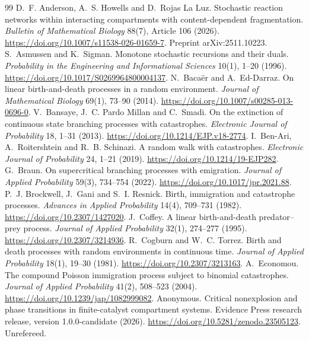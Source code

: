 \documentclass[11pt,a4paper]{article}
\numberwithin{equation}{section}
\theoremstyle{definition}\newtheorem{definition}[theorem]{Definition}
\theoremstyle{remark}\newtheorem{remark}[theorem]{Remark}\newtheorem{example}[theorem]{Example}
\begin{document}
\begin{thebibliography}{99}\small
{} D.~F. Anderson, A.~S. Howells and D.~Rojas La Luz. Stochastic reaction networks within interacting compartments with content-dependent fragmentation. \emph{Bulletin of Mathematical Biology} 88(7), Article 106 (2026). \url{https://doi.org/10.1007/s11538-026-01659-7}. Preprint arXiv:2511.10223.
 S.~Asmussen and K.~Sigman. Monotone stochastic recursions and their duals. \emph{Probability in the Engineering and Informational Sciences} 10(1), 1--20 (1996). \url{https://doi.org/10.1017/S0269964800004137}.
 N.~Baca\"er and A.~Ed-Darraz. On linear birth-and-death processes in a random environment. \emph{Journal of Mathematical Biology} 69(1), 73--90 (2014). \url{https://doi.org/10.1007/s00285-013-0696-0}.
 V.~Bansaye, J.~C. Pardo Millan and C.~Smadi. On the extinction of continuous state branching processes with catastrophes. \emph{Electronic Journal of Probability} 18, 1--31 (2013). \url{https://doi.org/10.1214/EJP.v18-2774}.
 I.~Ben-Ari, A.~Roitershtein and R.~B. Schinazi. A random walk with catastrophes. \emph{Electronic Journal of Probability} 24, 1--21 (2019). \url{https://doi.org/10.1214/19-EJP282}.
 G.~Braun. On supercritical branching processes with emigration. \emph{Journal of Applied Probability} 59(3), 734--754 (2022). \url{https://doi.org/10.1017/jpr.2021.88}.
 P.~J. Brockwell, J.~Gani and S.~I. Resnick. Birth, immigration and catastrophe processes. \emph{Advances in Applied Probability} 14(4), 709--731 (1982). \url{https://doi.org/10.2307/1427020}.
 J.~Coffey. A linear birth-and-death predator--prey process. \emph{Journal of Applied Probability} 32(1), 274--277 (1995). \url{https://doi.org/10.2307/3214936}.
 R.~Cogburn and W.~C. Torrez. Birth and death processes with random environments in continuous time. \emph{Journal of Applied Probability} 18(1), 19--30 (1981). \url{https://doi.org/10.2307/3213163}.
 A.~Economou. The compound Poisson immigration process subject to binomial catastrophes. \emph{Journal of Applied Probability} 41(2), 508--523 (2004). \url{https://doi.org/10.1239/jap/1082999082}.
 Anonymous. Critical nonexplosion and phase transitions in finite-catalyst compartment systems. Evidence Press research release, version 1.0.0-candidate (2026). \url{https://doi.org/10.5281/zenodo.23505123}. Unrefereed.

\end{thebibliography}
\end{document}
